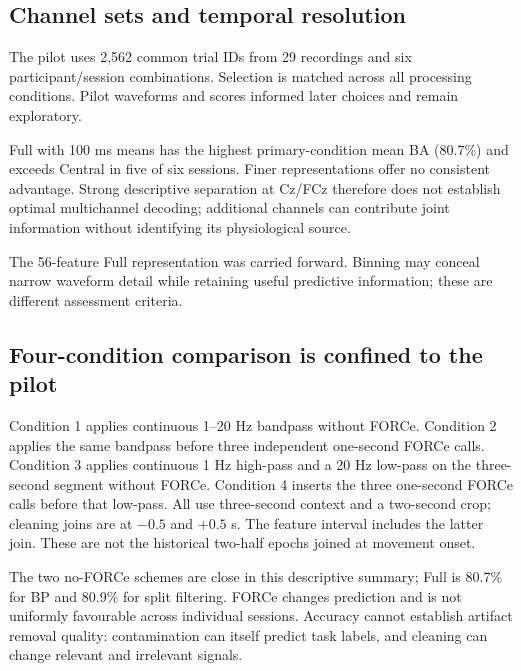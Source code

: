 \documentclass[11pt,a4paper]{article}
\begin{document}
\subsection{Channel sets and temporal resolution}
The pilot uses 2,562 common trial IDs from 29 recordings and six participant/session combinations. Selection is matched across all processing conditions. Pilot waveforms and scores informed later choices and remain exploratory.
\begin{table}[H]\centering

\caption{Mean session balanced accuracy (\%) for primary BP no-FORCe in the matched pilot. Each participant contributes three sessions, so the six-session mean also weights the two participants equally. Samples retain 350 original time points per channel.}\label{tab:pilot_resolution}
\end{table}
Full with 100 ms means has the highest primary-condition mean BA (80.7\%) and exceeds Central in five of six sessions. Finer representations offer no consistent advantage. Strong descriptive separation at Cz/FCz therefore does not establish optimal multichannel decoding; additional channels can contribute joint information without identifying its physiological source.

The 56-feature Full representation was carried forward. Binning may conceal narrow waveform detail while retaining useful predictive information; these are different assessment criteria.

\subsection{Four-condition comparison is confined to the pilot}
Condition 1 applies continuous 1--20 Hz bandpass without FORCe. Condition 2 applies the same bandpass before three independent one-second FORCe calls. Condition 3 applies continuous 1 Hz high-pass and a 20 Hz low-pass on the three-second segment without FORCe. Condition 4 inserts the three one-second FORCe calls before that low-pass. All use three-second context and a two-second crop; cleaning joins are at $-0.5$ and $+0.5$ s. The feature interval includes the latter join. These are not the historical two-half epochs joined at movement onset.
\begin{table}[H]\centering\small\setlength{\tabcolsep}{3.6pt}

\caption{Matched pilot mean session BA (\%) with 100 ms features. Every entry uses the same 2,562 trials. Appendix~\ref{app:pilot} retains Full results separately by participant/session.}\label{tab:pilot_processing}
\end{table}
The two no-FORCe schemes are close in this descriptive summary; Full is 80.7\% for BP and 80.9\% for split filtering. FORCe changes prediction and is not uniformly favourable across individual sessions. Accuracy cannot establish artifact removal quality: contamination can itself predict task labels, and cleaning can change relevant and irrelevant signals.
\end{document}
